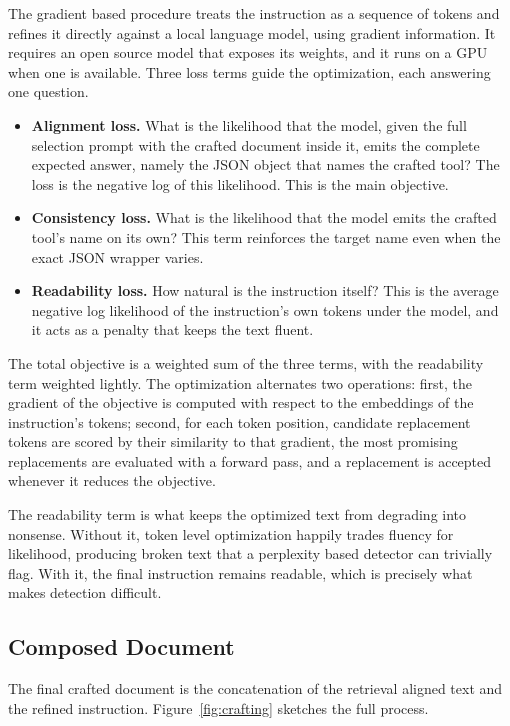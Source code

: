 \documentclass[11pt,a4paper]{report}
\begin{document}
The gradient based procedure treats the instruction as a sequence of
tokens and refines it directly against a local language model, using
gradient information. It requires an open source model that exposes its
weights, and it runs on a GPU when one is available. Three loss terms
guide the optimization, each answering one question.

\begin{itemize}
  \item \textbf{Alignment loss.} What is the likelihood that the model,
  given the full selection prompt with the crafted document inside it,
  emits the complete expected answer, namely the JSON object that names
  the crafted tool? The loss is the negative log of this likelihood.
  This is the main objective.
  \item \textbf{Consistency loss.} What is the likelihood that the model
  emits the crafted tool's name on its own? This term reinforces the
  target name even when the exact JSON wrapper varies.
  \item \textbf{Readability loss.} How natural is the instruction itself?
  This is the average negative log likelihood of the instruction's own
  tokens under the model, and it acts as a penalty that keeps the text
  fluent.
\end{itemize}

The total objective is a weighted sum of the three terms, with the
readability term weighted lightly. The optimization alternates two
operations: first, the gradient of the objective is computed with respect
to the embeddings of the instruction's tokens; second, for each token
position, candidate replacement tokens are scored by their similarity to
that gradient, the most promising replacements are evaluated with a
forward pass, and a replacement is accepted whenever it reduces the
objective.

The readability term is what keeps the optimized text from degrading
into nonsense. Without it, token level optimization happily trades
fluency for likelihood, producing broken text that a perplexity based
detector can trivially flag. With it, the final instruction remains
readable, which is precisely what makes detection difficult.

\subsection{Composed Document}

The final crafted document is the concatenation of the retrieval aligned
text and the refined instruction. Figure~\ref{fig:crafting} sketches the
full process.
\end{document}
